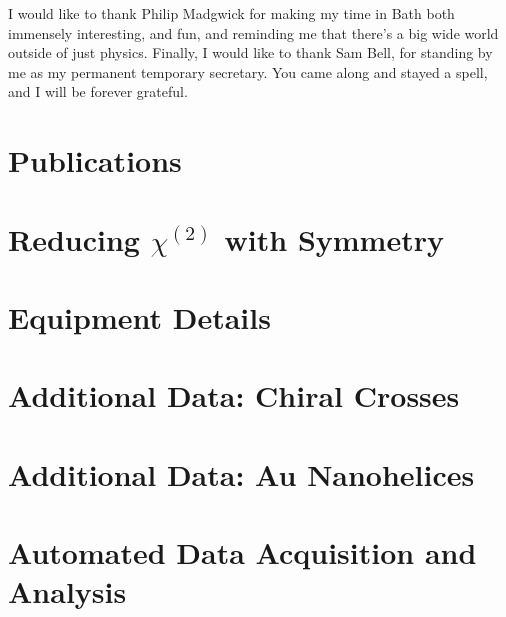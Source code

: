 \documentclass[11pt,a4paper,final]{report}
\begin{document}
I would like to thank Philip Madgwick for making my time in Bath both immensely interesting, and fun, and reminding me that there's a big wide world outside of just physics. Finally, I would like to thank Sam Bell, for standing by me as my permanent temporary secretary. You came along and stayed a spell, and I will be forever grateful.

\chapter*{Publications}


\bigskip \noindent {}

\bigskip \noindent {}

\bigskip \noindent {}

\bigskip \noindent {}













%


\clearpage

\appendix
\chapter{Reducing \texorpdfstring{$\chi^{(2)}$}{Lg} with Symmetry}\label{sec:appendix:rotations}

\chapter{Equipment Details}\label{sec:appendix:Hardware}

\chapter{Additional Data: Chiral Crosses}\label{sec:appendix:AdditionalCrosses}

\chapter{Additional Data: Au Nanohelices}\label{sec:appendix:AdditionalAuHelix}

\chapter{Automated Data Acquisition and Analysis}\label{sec:appendix:Code}

\end{document}
